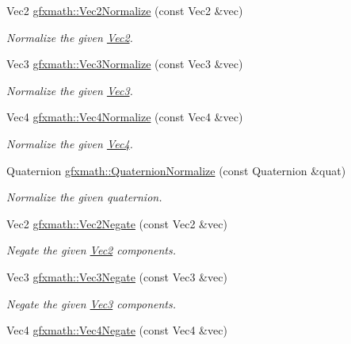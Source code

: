 \begin{DoxyCompactItemize}
Vec2 \hyperlink{group___s_i_s_d_vec_math_gaa0125e18e221531bfc7d72d47cdf42d9}{gfxmath\+::\+Vec2\+Normalize} (const Vec2 \&vec)
\begin{DoxyCompactList}\small\item\em Normalize the given \hyperlink{classgfxmath_1_1_vec2}{Vec2}. \end{DoxyCompactList}\item 
Vec3 \hyperlink{group___s_i_s_d_vec_math_gafdbff8ff3fad75f9a9e924a58fcc4f4a}{gfxmath\+::\+Vec3\+Normalize} (const Vec3 \&vec)
\begin{DoxyCompactList}\small\item\em Normalize the given \hyperlink{classgfxmath_1_1_vec3}{Vec3}. \end{DoxyCompactList}\item 
Vec4 \hyperlink{group___s_i_s_d_vec_math_gaf1fa3fbf9843a509f3b8a476aa18361b}{gfxmath\+::\+Vec4\+Normalize} (const Vec4 \&vec)
\begin{DoxyCompactList}\small\item\em Normalize the given \hyperlink{classgfxmath_1_1_vec4}{Vec4}. \end{DoxyCompactList}\item 
Quaternion \hyperlink{group___s_i_s_d_vec_math_ga0b4dfb2804fb5c44a112dc6b8ea43278}{gfxmath\+::\+Quaternion\+Normalize} (const Quaternion \&quat)
\begin{DoxyCompactList}\small\item\em Normalize the given quaternion. \end{DoxyCompactList}\item 
Vec2 \hyperlink{group___s_i_s_d_vec_math_ga55959c707ef1b444eb2d71009a201aa2}{gfxmath\+::\+Vec2\+Negate} (const Vec2 \&vec)
\begin{DoxyCompactList}\small\item\em Negate the given \hyperlink{classgfxmath_1_1_vec2}{Vec2} components. \end{DoxyCompactList}\item 
Vec3 \hyperlink{group___s_i_s_d_vec_math_ga8ccc52146f984a79c566ee8348e410e2}{gfxmath\+::\+Vec3\+Negate} (const Vec3 \&vec)
\begin{DoxyCompactList}\small\item\em Negate the given \hyperlink{classgfxmath_1_1_vec3}{Vec3} components. \end{DoxyCompactList}\item 
Vec4 \hyperlink{group___s_i_s_d_vec_math_ga9ba6951d54c6a4d9d513580f5bf3b928}{gfxmath\+::\+Vec4\+Negate} (const Vec4 \&vec)

\end{DoxyCompactItemize}
